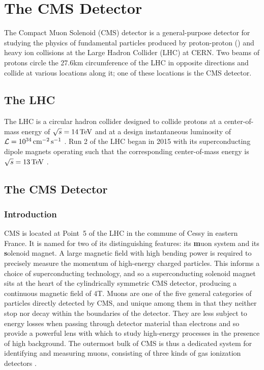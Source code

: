 \chapter{The CMS Detector}

The Compact Muon Solenoid (CMS) detector is a general-purpose detector for studying the physics of fundamental particles produced by proton-proton (\pp) and heavy ion collisions at the Large Hadron Collider (LHC) at CERN.
Two beams of protons circle the 27.6\unit{km} circumference of the LHC in opposite directions and collide at various locations along it; one of these locations is the CMS detector.

\section{The LHC}
The LHC is a circular hadron collider designed to collide protons at a center-of-mass energy of $\sqrt{s} = 14\,\text{Te\hspace{-.08em}V}$ and at a design instantaneous luminosity of $\mathcal{L} = 10^{34} \,\text{cm}^{-2} \text{\,s}^{-1}$ \cite{Evans:2008zzb}.
Run 2 of the LHC began in 2015 with its superconducting dipole magnets operating such that the corresponding center-of-mass energy is $\sqrt{s} = 13\,\text{Te\hspace{-.08em}V}$ \cite{Todesco:2017tcj}.

\section{The CMS Detector}
\subsection{Introduction}
\label{cms:intro}
CMS is located at Point~5 of the LHC in the commune of Cessy in eastern France.
It is named for two of its distinguishing features: its \textbf{m}uon system and its \textbf{s}olenoid magnet.
A large magnetic field with high bending power is required to precisely measure the momentum of high-energy charged particles.
This informs a choice of superconducting technology, and so a superconducting solenoid magnet sits at the heart of the cylindrically symmetric CMS detector, producing a continuous magnetic field of 4\unit{T}.
Muons are one of the five general categories of particles directly detected by CMS, and unique among them in that they neither stop nor decay within the boundaries of the detector.
They are less subject to energy losses when passing through detector material than electrons and so provide a powerful lens with which to study high-energy processes in the presence of high background.
The outermost bulk of CMS is thus a dedicated system for identifying and measuring muons, consisting of three kinds of gas ionization detectors \cite{Chatrchyan:2008zzk}.


